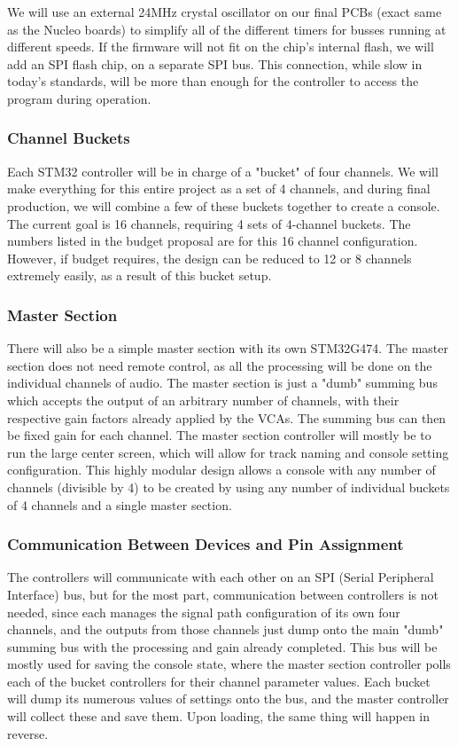 \documentclass[11pt, letterpaper,titlepage]{article}
\begin{document}
We will use an external 24MHz crystal oscillator on our final PCBs (exact same as the Nucleo boards) to simplify all of the different timers for busses running at different speeds. If the firmware will not fit on the chip's internal flash, we will add an SPI flash chip, on a separate SPI bus. This connection, while slow in today's standards, will be more than enough for the controller to access the program during operation.

\subsubsection*{Channel Buckets}
Each STM32 controller will be in charge of a "bucket" of four channels. We will make everything for this entire project as a set of 4 channels, and during final production, we will combine a few of these buckets together to create a console. The current goal is 16 channels, requiring 4 sets of 4-channel buckets. The numbers listed in the budget proposal are for this 16 channel configuration. However, if budget requires, the design can be reduced to 12 or 8 channels extremely easily, as a result of this bucket setup.

\subsubsection*{Master Section}
There will also be a simple master section with its own STM32G474. The master section does not need remote control, as all the processing will be done on the individual channels of audio. The master section is just a "dumb" summing bus which accepts the output of an arbitrary number of channels, with their respective gain factors already applied by the VCAs. The summing bus can then be fixed gain for each channel. The master section controller will mostly be to run the large center screen, which will allow for track naming and console setting configuration. This highly modular design allows a console with any number of channels (divisible by 4) to be created by using any number of individual buckets of 4 channels and a single master section.


\subsubsection*{Communication Between Devices and Pin Assignment}

The controllers will communicate with each other on an SPI (Serial Peripheral Interface) bus, but for the most part, communication between controllers is not needed, since each manages the signal path configuration of its own four channels, and the outputs from those channels just dump onto the main "dumb" summing bus with the processing and gain already completed. This bus will be mostly used for saving the console state, where the master section controller polls each of the bucket controllers for their channel parameter values. Each bucket will dump its numerous values of settings onto the bus, and the master controller will collect these and save them. Upon loading, the same thing will happen in reverse.
\end{document}
